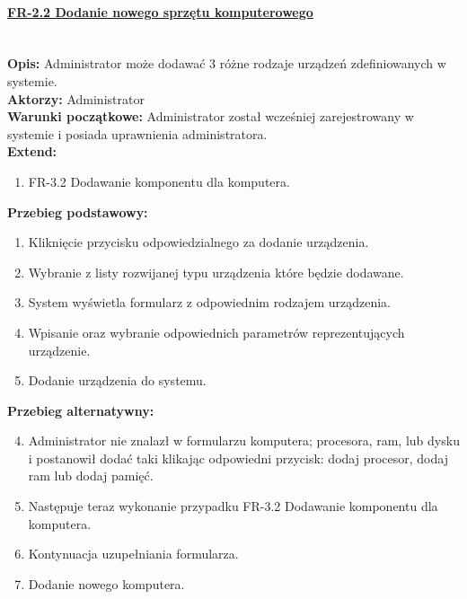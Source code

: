 \paragraph{\underline{FR-2.2 Dodanie nowego sprzętu komputerowego}}\mbox{}\\[1mm]
	\noindent\textbf{Opis:} Administrator może dodawać 3 różne rodzaje urządzeń zdefiniowanych w systemie.\\
	\noindent\textbf{Aktorzy:} Administrator\\
	\textbf{Warunki początkowe:} Administrator został wcześniej zarejestrowany w systemie i posiada uprawnienia administratora.\\
	\textbf{Extend:} 
	\begin{enumerate}[noparskip]
		\item FR-3.2 Dodawanie komponentu dla komputera.
	\end{enumerate}
	\textbf{Przebieg podstawowy:}
	\begin{enumerate}[noparskip]
		\item Kliknięcie przycisku odpowiedzialnego za dodanie urządzenia.
    \item Wybranie z listy rozwijanej typu urządzenia które będzie dodawane.
		\item System wyświetla formularz z odpowiednim rodzajem urządzenia.
		\item Wpisanie oraz wybranie odpowiednich parametrów reprezentujących urządzenie.
		\item Dodanie urządzenia do systemu.	\end{enumerate} 
	\textbf{Przebieg alternatywny:}
	\begin{enumerate}[noparskip]\setcounter{enumi}{3}
		\item Administrator nie znalazł w formularzu komputera; procesora, ram, lub dysku i postanowił dodać taki klikając odpowiedni przycisk: dodaj procesor, dodaj ram lub dodaj pamięć.
		\item Następuje teraz wykonanie przypadku FR-3.2 Dodawanie komponentu dla komputera.
		\item Kontynuacja uzupełniania formularza.
		\item Dodanie nowego komputera.
	\end{enumerate} \mbox{}\\[-11mm]

